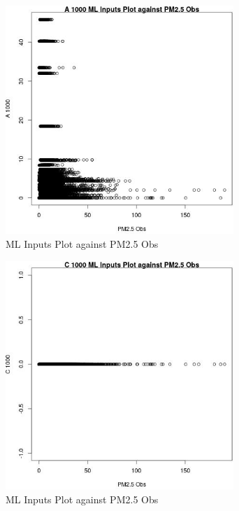 \begin{figure} 
\centering  
\includegraphics[width=0.77\textwidth]{Code_Outputs/Report_ML_input_PM25_Step4_part_e_de_duplicated_aves_A_1000vPM25_Obs.jpg} 
\caption{\label{fig:Report_ML_input_PM25_Step4_part_e_de_duplicated_avesA_1000vPM25_Obs}ML Inputs Plot against PM2.5 Obs} 
\end{figure} 
 

\begin{figure} 
\centering  
\includegraphics[width=0.77\textwidth]{Code_Outputs/Report_ML_input_PM25_Step4_part_e_de_duplicated_aves_C_1000vPM25_Obs.jpg} 
\caption{\label{fig:Report_ML_input_PM25_Step4_part_e_de_duplicated_avesC_1000vPM25_Obs}ML Inputs Plot against PM2.5 Obs} 
\end{figure} 
 


